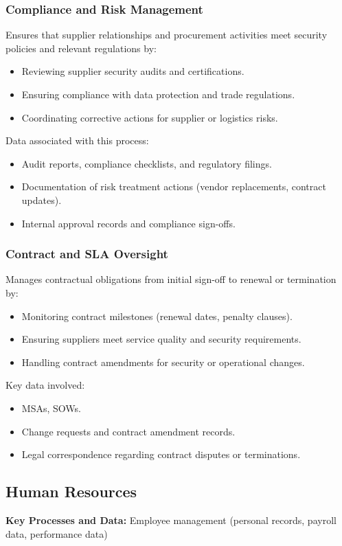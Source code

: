 \subsubsection{Compliance and Risk Management}
Ensures that supplier relationships and procurement activities meet security policies and
relevant regulations by:
\begin{itemize}
    \item Reviewing supplier security audits and certifications.
    \item Ensuring compliance with data protection and trade regulations.
    \item Coordinating corrective actions for supplier or logistics risks.
\end{itemize}
\noindent
Data associated with this process:
\begin{itemize}
    \item Audit reports, compliance checklists, and regulatory filings.
    \item Documentation of risk treatment actions (vendor replacements, contract updates).
    \item Internal approval records and compliance sign-offs.
\end{itemize}

\subsubsection{Contract and \ac{SLA} Oversight}
Manages contractual obligations from initial sign-off to renewal or termination by:
\begin{itemize}
    \item Monitoring contract milestones (renewal dates, penalty clauses).
    \item Ensuring suppliers meet service quality and security requirements.
    \item Handling contract amendments for security or operational changes.
\end{itemize}
\noindent
Key data involved:
\begin{itemize}
    \item \ac{MSAs}, \ac{SOWs}.
    \item Change requests and contract amendment records.
    \item Legal correspondence regarding contract disputes or terminations.
\end{itemize}

\subsection{Human Resources}
\textbf{Key Processes and Data:} Employee management (personal records, payroll data, 
performance data)  

